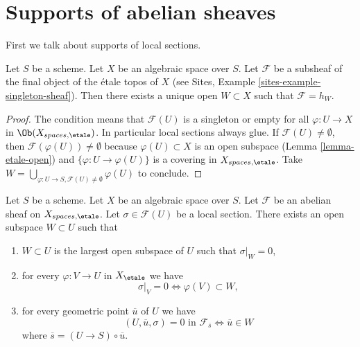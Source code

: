 \section{Supports of abelian sheaves}
\label{section-support}

\noindent
First we talk about supports of local sections.

\begin{lemma}
\label{lemma-support-subsheaf-final}
Let $S$ be a scheme. Let $X$ be an algebraic space over $S$.
Let $\mathcal{F}$ be a subsheaf of the final object of the \'etale
topos of $X$ (see
Sites, Example \ref{sites-example-singleton-sheaf}).
Then there exists a unique open
$W \subset X$ such that $\mathcal{F} = h_W$.
\end{lemma}

\begin{proof}
The condition means that $\mathcal{F}(U)$ is a singleton or
empty for all $\varphi : U \to X$ in $\Ob(X_{spaces, \etale})$.
In particular local sections always glue. If
$\mathcal{F}(U) \not = \emptyset$, then
$\mathcal{F}(\varphi(U)) \not = \emptyset$ because
$\varphi(U) \subset X$ is an open subspace
(Lemma \ref{lemma-etale-open})
and
$\{\varphi : U \to \varphi(U)\}$ is a covering in $X_{spaces, \etale}$.
Take
$W = \bigcup_{\varphi : U \to S, \mathcal{F}(U) \not = \emptyset} \varphi(U)$
to conclude.
\end{proof}

\begin{lemma}
\label{lemma-zero-over-image}
Let $S$ be a scheme.
Let $X$ be an algebraic space over $S$.
Let $\mathcal{F}$ be an abelian sheaf on $X_{spaces, \etale}$.
Let $\sigma \in \mathcal{F}(U)$ be a local section.
There exists an open subspace $W \subset U$ such that
\begin{enumerate}
\item $W \subset U$ is the largest open subspace of $U$ such
that $\sigma|_W = 0$,
\item for every $\varphi : V \to U$ in $X_\etale$ we have
$$
\sigma|_V = 0 \Leftrightarrow \varphi(V) \subset W,
$$
\item for every geometric point $\overline{u}$ of $U$ we have
$$
(U, \overline{u}, \sigma) = 0\text{ in }\mathcal{F}_{\overline{s}}
\Leftrightarrow
\overline{u} \in W
$$
where $\overline{s} = (U \to S) \circ \overline{u}$.
\end{enumerate}
\end{lemma}

